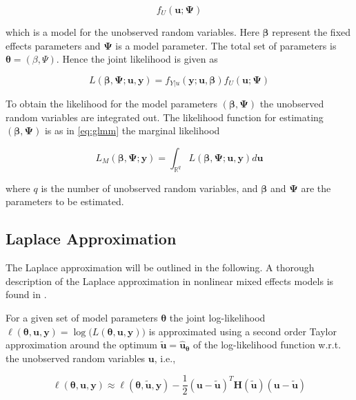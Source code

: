 \documentclass[a4paper,twoside,11pt]{report} %
\theoremstyle{definition}
\theoremstyle{definition}
\theoremstyle{definition}
\theoremstyle{definition}
\theoremstyle{remark}
\begin{document}
\begin{equation}
  f_{U}(\boldsymbol{u; \Psi})
\end{equation}

which is a model for the unobserved random variables. Here \(\boldsymbol{\beta}\) represent the fixed effects parameters and \(\boldsymbol{\Psi}\) is a model parameter. The total set of parameters is \(\boldsymbol{\theta}=(\beta, \Psi)\). Hence the joint likelihood is given as

\begin{equation}
  L(\boldsymbol{\beta, \Psi; u, y})=f_{Y|u}(\boldsymbol{y;u,\beta}) f_{U}(\boldsymbol{u; \Psi})
\end{equation}

To obtain the likelihood for the model parameters \((\boldsymbol{\beta, \Psi})\) the unobserved random variables are integrated out. The likelihood function for estimating \((\boldsymbol{\beta, \Psi})\) is as in \eqref{eq:glmm} the marginal likelihood

\begin{equation}\label{eq:glmm2}
  L_{M}(\boldsymbol{\beta, \Psi; y})=\int_{\mathbb{R}^{q}} L(\boldsymbol{\beta, \Psi;u,y}) d\boldsymbol{u}
\end{equation}

where \(q\) is the number of unobserved random variables, and \(\boldsymbol{\beta}\) and \(\boldsymbol{\Psi}\) are the parameters to be estimated.

\subsection{Laplace Approximation}

The Laplace approximation will be outlined in the following. A thorough description of the Laplace approximation in nonlinear mixed effects models is found in \textcite{Wolfinger_1997}.

For a given set of model parameters \(\boldsymbol{\theta}\) the joint log-likelihood \(\ell(\boldsymbol{\theta, u, y})=\log\big(L(\boldsymbol{\theta, u, y})\big)\) is approximated using a second order Taylor approximation around the optimum \(\boldsymbol{\tilde{u}}=\boldsymbol{\hat{u}_\theta}\) of the log-likelihood function w.r.t. the unobserved random variables \(\boldsymbol{u}\), i.e.,

\begin{equation}\label{eq:laplaceApprox}
  \ell(\boldsymbol{\theta, u, y})\approx\ell(\boldsymbol{\theta, \tilde{u}, y}) - \frac{1}{2}(\boldsymbol{u-\tilde{u}})^T \boldsymbol{H}(\boldsymbol{\tilde{u}})(\boldsymbol{u-\tilde{u}})
\end{equation}
\end{document}
